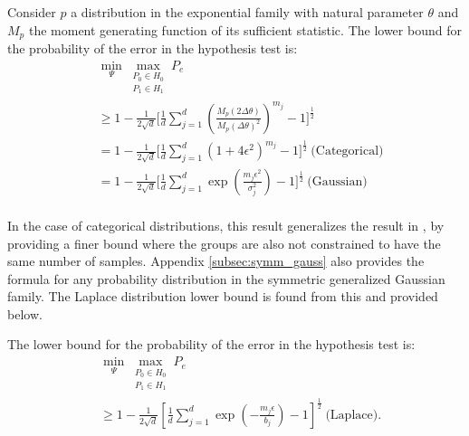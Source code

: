 \begin{corollary}\label{cor:ef} Consider $p$ a distribution in the exponential family with natural parameter $\theta$ and $M_p$ the moment generating function of its sufficient statistic. The lower bound for the probability of the error in the hypothesis test is:
\begin{align*}
      &\min _{\Psi} 
    \max _{\substack{P_0 \in H_0 \\ P_1 \in H_1}}
        P_e \\
        &\geq 1 - \frac{1}{2\sqrt{d}} 
        \Bigg[ \frac{1}{d} \sum_{j=1}^d
            \left(\frac{M_p(2\Delta\theta)}{M_p(\Delta \theta)^2}\right)^{m_j}
            -
            1
            \Bigg]^{\frac{1}{2}}\\
        &= 1 - \frac{1}{2\sqrt{d}} 
        \Bigg[ \frac{1}{d} \sum_{j=1}^d
            \left(1+4\epsilon^2\right)^{m_j}
            -
            1
            \Bigg]^{\frac{1}{2}}~\text{(Categorical)}\\
        &=1 - \frac{1}{2\sqrt{d}} 
        \Bigg[
            \frac{1}{d} \sum_{j=1}^d \exp\left(\frac{{m_j}\epsilon^2}{\sigma_j^2}\right)
            -
            1
            \Bigg]^{\frac{1}{2}}~\text{(Gaussian)}\\
\end{align*}
\end{corollary}


In the case of categorical distributions, this result generalizes the result in \citep{monteiro2022epistemic}, by providing a finer bound where the groups are also not constrained to have the same number of samples. Appendix \ref{subsec:symm_gauss} also provides the formula for any probability distribution in the symmetric generalized Gaussian family. The Laplace distribution lower bound is found from this and provided below.

\begin{corollary}\label{cor:laplace} The lower bound for the probability of the error in the hypothesis test is:
\begin{align*}
         &\min _{\Psi} 
    \max _{\substack{P_0 \in H_0 \\ P_1 \in H_1}}
        P_e \\
        &\geq1 - \frac{1}{2\sqrt{d}}\left[
             \frac{1}{d}
            \sum_{j=1}^d 
            \exp\left(-\frac{m_j\epsilon }{b_j} \right)
            -1
            \right]^{\frac{1}{2}}~\text{(Laplace)}.
\end{align*}
\end{corollary}

